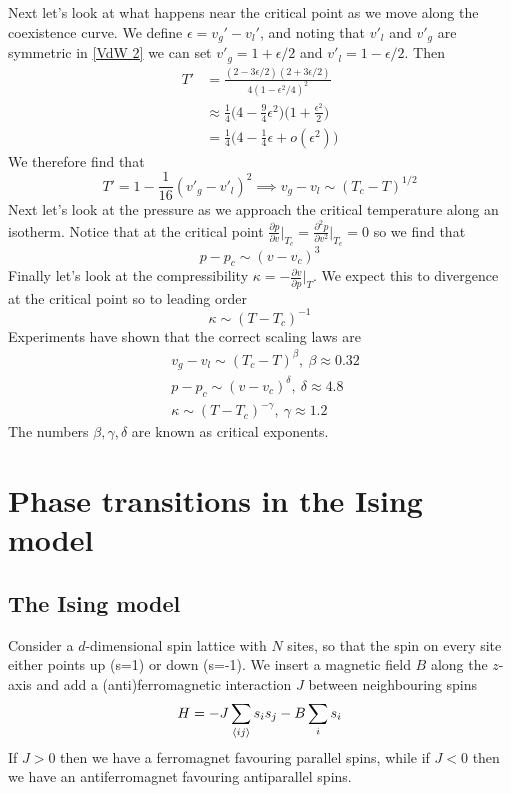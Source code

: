 \documentclass[a4paper,11pt,oneside]{book}
\begin{document}
Next let's look at what happens near the critical point as we move along the coexistence curve. We define $\epsilon=v_g'-v_l'$, and noting that $v'_l$ and $v'_g$ are symmetric in \eqref{VdW 2} we can set $v'_g = 1+\epsilon/2$ and $v'_l = 1-\epsilon/2$. Then
\begin{align}
    T' &= \frac{(2-3\epsilon/2)(2+3\epsilon/2)}{4(1-\epsilon^2/4)^2}\\
    &\approx \frac{1}{4}\bigg(4-\frac{9}{4}\epsilon^2\bigg)\bigg(1+\frac{\epsilon^2}{2}\bigg)\\
    &=\frac{1}{4}\bigg(4-\frac{1}{4}\epsilon+o(\epsilon^2)\bigg)
\end{align}
We therefore find that 
\begin{equation}
    T' = 1-\frac{1}{16}(v'_g-v'_l)^2 \implies v_g-v_l \sim (T_c-T)^{1/2}
\end{equation}
Next let's look at the pressure as we approach the critical temperature along an isotherm. Notice that at the critical point $\frac{\partial p}{\partial v}\bigg|_{T_c} = \frac{\partial^2p}{\partial v^2}\bigg|_{T_c}=0$ so we find that
\begin{equation}
    p-p_c \sim (v-v_c)^3
\end{equation}
Finally let's look at the compressibility $\kappa = -\frac{\partial v}{\partial p}\bigg|_T$. We expect this to divergence at the critical point so to leading order
\begin{equation}
    \kappa \sim (T-T_c)^{-1}
\end{equation}
Experiments have shown that the correct scaling laws are
\begin{align}
    &v_g-v_l \sim (T_c-T)^\beta, \ \beta \approx 0.32 \\
    &p-p_c\sim (v-v_c)^\delta, \ \delta \approx 4.8\\
    & \kappa \sim (T-T_c)^{-\gamma}, \ \gamma \approx 1.2
\end{align}
The numbers $\beta, \gamma, \delta$ are known as critical exponents.
\section{Phase transitions in the Ising model}
\subsection*{The Ising model}
Consider a $d$-dimensional spin lattice with $N$ sites, so that the spin on every site either points up (s=1) or down (s=-1). We insert a magnetic field $B$ along the $z$-axis and add a (anti)ferromagnetic interaction $J$ between neighbouring spins
\begin{equation}
    H = -J \sum_{\braket{ij}} s_i s_j -B\sum_i s_i
\end{equation}
If $J>0$ then we have a ferromagnet favouring parallel spins, while if $J<0$ then we have an antiferromagnet favouring antiparallel spins.
\end{document}
